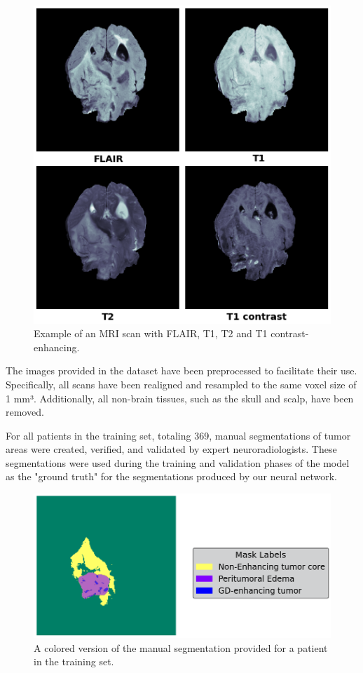 \documentclass[10pt,twocolumn,letterpaper]{article}
\begin{document}
\begin{figure}[H]
    \centering
    \includegraphics[width=0.6\linewidth]{img/example_MRI.png}
    \caption{Example of an MRI scan with FLAIR, T1, T2 and T1 contrast-enhancing.}
\end{figure}

The images provided in the dataset have been preprocessed to facilitate their use. Specifically, all scans have been realigned and resampled to the same voxel size of 1 mm³. Additionally, all non-brain tissues, such as the skull and scalp, have been removed.

For all patients in the training set, totaling 369, manual segmentations of tumor areas were created, verified, and validated by expert neuroradiologists. These segmentations were used during the training and validation phases of the model as the "ground truth" for the segmentations produced by our neural network.

\begin{figure}[H]
    \centering
    \includegraphics[width=0.8\linewidth]{img/groundtruth_example.png}
    \caption{A colored version of the manual segmentation provided for a patient in the training set.}
\end{figure}
\end{document}
